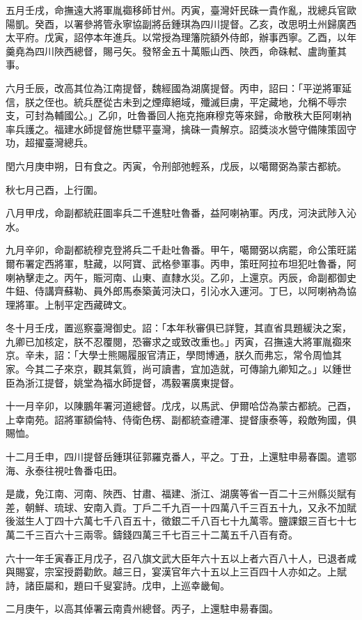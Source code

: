 \begin{pinyinscope}
五月壬戌，命撫遠大將軍胤禵移師甘州。丙寅，臺灣奸民硃一貴作亂，戕總兵官歐陽凱。癸酉，以署參將管永寧協副將岳鍾琪為四川提督。乙亥，改思明土州歸廣西太平府。戊寅，詔停本年進兵。以常授為理籓院額外侍郎，辦事西寧。乙酉，以年羹堯為四川陜西總督，賜弓矢。發帑金五十萬賑山西、陜西，命硃軾、盧詢董其事。

六月壬辰，改高其位為江南提督，魏經國為湖廣提督。丙申，詔曰：「平逆將軍延信，朕之侄也。統兵歷從古未到之煙瘴絕域，殲滅巨虜，平定藏地，允稱不辱宗支，可封為輔國公。」乙卯，吐魯番回人拖克拖麻穆克等來歸，命散秩大臣阿喇衲率兵護之。福建水師提督施世驃平臺灣，擒硃一貴解京。詔獎淡水營守備陳策固守功，超擢臺灣總兵。

閏六月庚申朔，日有食之。丙寅，令刑部弛輕系，戊辰，以噶爾弼為蒙古都統。

秋七月己酉，上行圍。

八月甲戌，命副都統莊圖率兵二千進駐吐魯番，益阿喇衲軍。丙戌，河決武陟入沁水。

九月辛卯，命副都統穆克登將兵二千赴吐魯番。甲午，噶爾弼以病罷，命公策旺諾爾布署定西將軍，駐藏，以阿寶、武格參軍事。丙申，策旺阿拉布坦犯吐魯番，阿喇衲擊走之。丙午，賑河南、山東、直隸水災。乙卯，上還京。丙辰，命副都御史牛鈕、侍講齊蘇勒、員外郎馬泰築黃河決口，引沁水入運河。丁巳，以阿喇衲為協理將軍。上制平定西藏碑文。

冬十月壬戌，置巡察臺灣御史。詔：「本年秋審俱已詳覽，其直省具題緩決之案，九卿已加核定，朕不忍覆閱，恐審求之或致改重也。」丙寅，召撫遠大將軍胤禵來京。辛未，詔：「大學士熊賜履服官清正，學問博通，朕久而弗忘，常令周恤其家。今其二子來京，觀其氣質，尚可讀書，宜加造就，可傳諭九卿知之。」以鍾世臣為浙江提督，姚堂為福水師提督，馮毅署廣東提督。

十一月辛卯，以陳鵬年署河道總督。戊戌，以馬武、伊爾哈岱為蒙古都統。己酉，上幸南苑。詔將軍額倫特、侍衛色楞、副都統查禮渾、提督康泰等，殺敵殉國，俱賜恤。

十二月壬申，四川提督岳鍾琪征郭羅克番人，平之。丁丑，上還駐申昜春園。遣鄂海、永泰往視吐魯番屯田。

是歲，免江南、河南、陜西、甘肅、福建、浙江、湖廣等省一百二十三州縣災賦有差，朝鮮、琉球、安南入貢。丁戶二千九百一十四萬八千三百五十九，又永不加賦後滋生人丁四十六萬七千八百五十，徵銀二千八百七十九萬零。鹽課銀三百七十七萬二千三百六十三兩零。鑄錢四萬三千七百三十二萬五千八百有奇。

六十一年壬寅春正月戊子，召八旗文武大臣年六十五以上者六百八十人，已退者咸與賜宴，宗室授爵勸飲。越三日，宴漢官年六十五以上三百四十人亦如之。上賦詩，諸臣屬和，題曰千叟宴詩。戊申，上巡幸畿甸。

二月庚午，以高其倬署云南貴州總督。丙子，上還駐申昜春園。


\end{pinyinscope}
